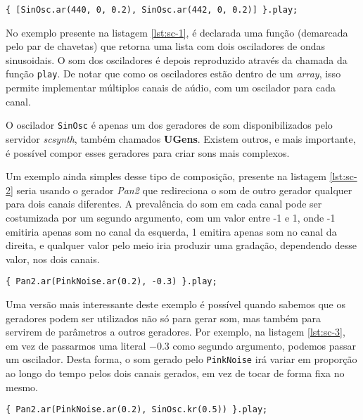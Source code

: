 \begin{lstlisting}[caption={Declaração de dois canais de aúdio com base em dois osciladores},label={lst:sc-1}]
{ [SinOsc.ar(440, 0, 0.2), SinOsc.ar(442, 0, 0.2)] }.play;
\end{lstlisting}

No exemplo presente na listagem \ref{lst:sc-1}, é declarada uma função (demarcada pelo par de chavetas) que retorna uma lista com dois osciladores de ondas sinusoidais. O som dos osciladores é depois reproduzido através da chamada da função \texttt{play}. De notar que como os osciladores estão dentro de um \textit{array}, isso permite implementar múltiplos canais de aúdio, com um oscilador para cada canal.

O oscilador \texttt{SinOsc} é apenas um dos geradores de som disponibilizados pelo servidor \textit{scsynth}, também chamados \textbf{UGens}. Existem outros, e mais importante, é possível compor esses geradores para criar sons mais complexos.

Um exemplo ainda simples desse tipo de composição, presente na listagem \ref{lst:sc-2} seria usando o gerador \textit{Pan2} que redireciona o som de outro gerador qualquer para dois canais diferentes. A prevalência do som em cada canal pode ser costumizada por um segundo argumento, com um valor entre -1 e 1, onde -1 emitiria apenas som no canal da esquerda, 1 emitira apenas som no canal da direita, e qualquer valor pelo meio iria produzir uma gradação, dependendo desse valor, nos dois canais.

\begin{lstlisting}[caption={Dividir um gerador por dois canais de forma desigual},label={lst:sc-2}]
{ Pan2.ar(PinkNoise.ar(0.2), -0.3) }.play;
\end{lstlisting}

Uma versão mais interessante deste exemplo é possível quando sabemos que os geradores podem ser utilizados não só para gerar som, mas também para servirem de parâmetros a outros geradores. Por exemplo, na listagem \ref{lst:sc-3}, em vez de passarmos uma literal $-0.3$ como segundo argumento, podemos passar um oscilador. Desta forma, o som gerado pelo \texttt{PinkNoise} irá variar em proporção ao longo do tempo pelos dois canais gerados, em vez de tocar de forma fixa no mesmo.

\begin{lstlisting}[caption={Dividir um gerador por dois canais de forma desigual},label={lst:sc-3}]
{ Pan2.ar(PinkNoise.ar(0.2), SinOsc.kr(0.5)) }.play;
\end{lstlisting}

